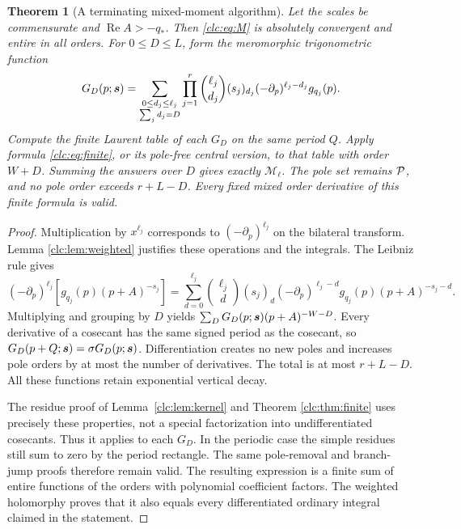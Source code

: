 \documentclass[11pt,a4paper]{article}
\numberwithin{equation}{section}
\newtheorem{theorem}{Theorem}[section]
\theoremstyle{definition}\newtheorem{definition}[theorem]{Definition}
\theoremstyle{remark}\newtheorem{remark}[theorem]{Remark}
\DeclareMathOperator{\Rea}{Re}
\begin{document}
\begin{theorem}[A terminating mixed-moment algorithm]
\label{clc:thm:moments}
Let the scales be commensurate and $\Rea A>-q_*$. Then
\eqref{clc:eq:M} is absolutely convergent and entire in all orders.
For $0\le D\le L$, form the meromorphic trigonometric function
\begin{equation}\label{clc:eq:GD}
 G_D(p;\boldsymbol s)=
 \sum_{\substack{0\le d_j\le\ell_j\\\sum_jd_j=D}}
 \prod_{j=1}^r
 \binom{\ell_j}{d_j}(s_j)_{d_j}
 (-\partial_p)^{\ell_j-d_j}g_{q_j}(p).
\end{equation}
Compute the finite Laurent table of each $G_D$ on the same period $Q$.
Apply formula \eqref{clc:eq:finite}, or its pole-free central version,
to that table with order $W+D$. Summing the answers over $D$ gives
exactly $\mathcal M_{\boldsymbol\ell}$.
The pole set remains $\mathcal P$, and no pole order exceeds $r+L-D$.
Every fixed mixed order derivative of this finite formula is valid.
\end{theorem}
\begin{proof}
Multiplication by $x^{\ell_j}$ corresponds to
$(-\partial_p)^{\ell_j}$ on the bilateral transform. Lemma
\ref{clc:lem:weighted} justifies these operations and the integrals.
The Leibniz rule gives
\[
 (-\partial_p)^{\ell_j}[g_{q_j}(p)(p+A)^{-s_j}]
 =\sum_{d=0}^{\ell_j}\binom{\ell_j}{d}(s_j)_d
   (-\partial_p)^{\ell_j-d}g_{q_j}(p)(p+A)^{-s_j-d}.
\]
Multiplying and grouping by $D$ yields
$\sum_DG_D(p;\boldsymbol s)(p+A)^{-W-D}$.
Every derivative of a cosecant has the same signed period as the
cosecant, so $G_D(p+Q;\boldsymbol s)=\sigma G_D(p;\boldsymbol s)$.
Differentiation creates no new poles and increases pole orders by at
most the number of derivatives. The total is at most $r+L-D$.
All these functions retain exponential vertical decay.

The residue proof of Lemma~\ref{clc:lem:kernel} and Theorem
\ref{clc:thm:finite} uses precisely these properties, not a special
factorization into undifferentiated cosecants. Thus it applies to each
$G_D$. In the periodic case the simple residues still sum to zero by
the period rectangle. The same pole-removal and branch-jump proofs
therefore remain valid. The resulting expression is a finite sum of
entire functions of the orders with polynomial coefficient factors.
The weighted holomorphy proves that it also equals every differentiated
ordinary integral claimed in the statement.
\end{proof}
\end{document}
